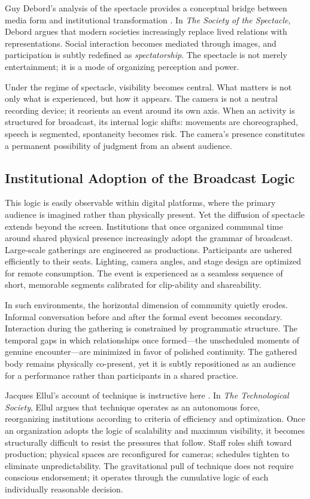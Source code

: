 \documentclass[12pt]{article}
\begin{document}
Guy Debord's analysis of the spectacle provides a conceptual bridge between media form and institutional transformation \citep{Debord1994}. In \emph{The Society of the Spectacle}, Debord argues that modern societies increasingly replace lived relations with representations. Social interaction becomes mediated through images, and participation is subtly redefined as \emph{spectatorship}. The spectacle is not merely entertainment; it is a mode of organizing perception and power.

Under the regime of spectacle, visibility becomes central. What matters is not only what is experienced, but how it appears. The camera is not a neutral recording device; it reorients an event around its own axis. When an activity is structured for broadcast, its internal logic shifts: movements are choreographed, speech is segmented, spontaneity becomes risk. The camera's presence constitutes a permanent possibility of judgment from an absent audience.

\subsection{Institutional Adoption of the Broadcast Logic}

This logic is easily observable within digital platforms, where the primary audience is imagined rather than physically present. Yet the diffusion of spectacle extends beyond the screen. Institutions that once organized communal time around shared physical presence increasingly adopt the grammar of broadcast. Large-scale gatherings are engineered as productions. Participants are ushered efficiently to their seats. Lighting, camera angles, and stage design are optimized for remote consumption. The event is experienced as a seamless sequence of short, memorable segments calibrated for clip-ability and shareability.

In such environments, the horizontal dimension of community quietly erodes. Informal conversation before and after the formal event becomes secondary. Interaction during the gathering is constrained by programmatic structure. The temporal gaps in which relationships once formed---the unscheduled moments of genuine encounter---are minimized in favor of polished continuity. The gathered body remains physically co-present, yet it is subtly repositioned as an audience for a performance rather than participants in a shared practice.

Jacques Ellul's account of technique is instructive here \citep{Ellul1964}. In \emph{The Technological Society}, Ellul argues that technique operates as an autonomous force, reorganizing institutions according to criteria of efficiency and optimization. Once an organization adopts the logic of scalability and maximum visibility, it becomes structurally difficult to resist the pressures that follow. Staff roles shift toward production; physical spaces are reconfigured for cameras; schedules tighten to eliminate unpredictability. The gravitational pull of technique does not require conscious endorsement; it operates through the cumulative logic of each individually reasonable decision.
\end{document}
